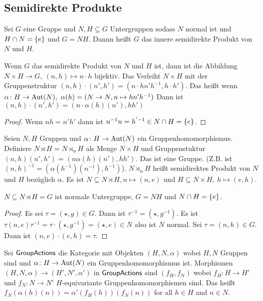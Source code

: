 \subsection{Semidirekte Produkte}
\begin{Def}
    Sei $G$ eine Gruppe und $N,H\subseteq  G$ Untergruppen sodass $N$ normal ist und $H\cap N=\{e\}$ und $G=NH$. Dannn heißt $G$ das innere semidirekte Produkt von $N$ und $H$.
\end{Def}
\begin{Bem}
    Wenn $G$ das semidirekte Produkt von $N$ und $H$ ist, dann ist die Abbildung $N\times H\to G,\ (n,h)\mapsto n\cdot h$ bijektiv. Das Verleiht $N\times H$ mit der Gruppenstruktur $(n,h)\cdot (n',h')=(n\cdot hn'h^{-1},h\cdot h')$. Das heißt wenn $\alpha\colon H\to\Aut(N),\ \alpha(h)=(N\to N, n\mapsto hn'h^{-1})$ Dann ist $(n,h)\cdot(n',h')=(n\cdot\alpha(h)(n'),hh')$
\end{Bem}
\begin{proof}
    Wenn $nh=n'h'$ dann ist $n^{-1}n=h^{'-1}\in N\cap H=\{e\}$.
\end{proof}
\begin{Def}
    Seien $N,H$ Gruppen und $\alpha\colon H\to\operatorname{Aut}(N)$ ein Gruppenhomomorphismus. Definiere $N\rtimes H=N\rtimes_\alpha H$ als Menge $N\times H$ und Gruppenstuktur $(n,h)(n',h')=(n\alpha(h)(n'),hh')$. Das ist eine Gruppe. (Z.B. ist $(n,h)^{-1}=(\alpha(h^{-1})(n^{-1}),h^{-1})$). $N\rtimes_\alpha H$ heißt semidirektes Produkt von $N$ und $H$ bezüglich $\alpha$.
    Es ist $N\subseteq N\rtimes H, n\mapsto (n,e)$ und $H\subseteq N\times H,\ h\mapsto (e,h)$.
\end{Def}
\begin{Lemma}
    $N\subseteq N\rtimes H=G$ ist normale Untergruppe, $G=NH$ und $N\cap H=\{e\}$.
\end{Lemma}
\begin{proof}
    Es sei $\tau=(\star,g)\in G$. Dann ist $\tau^{-1}=(\star,g^{-1})$.
    Es ist $\tau(n,e)\tau^{-1}=\tau\cdot(\star,g^{-1})=(\star,e)\in N$ also ist $N$ normal. 
    Sei $\tau=(n,h)\in G$. Dann ist $(n,e)\cdot (e, h)=\tau$.
\end{proof}
\begin{Def}
    Sei $\mathsf{GroupActions}$ die Kategorie mit Objekten $(H,N,\alpha)$ wobei $H,N$ Gruppen sind und $\alpha\colon H\to\operatorname{Aut}(N)$ ein Gruppenhomomorphismus ist. Morphismen $(H,N,\alpha)\to (H',N',\alpha')$ in $\mathsf{GroupActions}$ sind $(f_H,f_N)$ wobei $f_H\colon H\to H'$  und $f_N\colon N\to N'$ $H$-equivariante Gruppenhomomorphismen sind. Das heißt
    $f_N(\alpha(h)(n))=\alpha'(f_H(h))(f_N(n))$ for all $h\in H$ and $n\in N$.
\end{Def}

